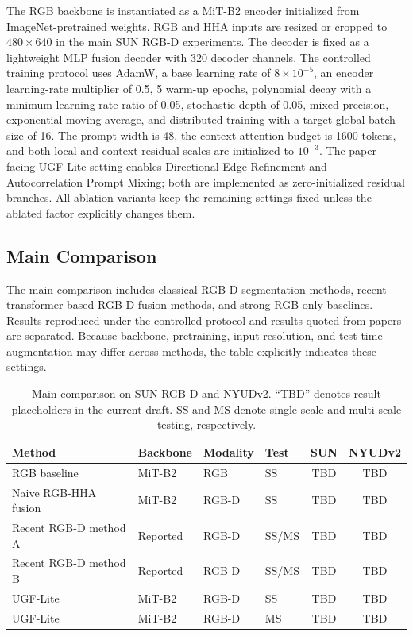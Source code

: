 \documentclass[a4paper,fleqn]{cas-dc}
\begin{document}
The RGB backbone is instantiated as a MiT-B2 encoder initialized from ImageNet-pretrained weights. RGB and HHA inputs are resized or cropped to $480\times640$ in the main SUN RGB-D experiments. The decoder is fixed as a lightweight MLP fusion decoder with 320 decoder channels. The controlled training protocol uses AdamW, a base learning rate of $8\times10^{-5}$, an encoder learning-rate multiplier of 0.5, 5 warm-up epochs, polynomial decay with a minimum learning-rate ratio of 0.05, stochastic depth of 0.05, mixed precision, exponential moving average, and distributed training with a target global batch size of 16. The prompt width is 48, the context attention budget is 1600 tokens, and both local and context residual scales are initialized to $10^{-3}$. The paper-facing UGF-Lite setting enables Directional Edge Refinement and Autocorrelation Prompt Mixing; both are implemented as zero-initialized residual branches. All ablation variants keep the remaining settings fixed unless the ablated factor explicitly changes them.

\subsection{Main Comparison}

The main comparison includes classical RGB-D segmentation methods, recent transformer-based RGB-D fusion methods, and strong RGB-only baselines. Results reproduced under the controlled protocol and results quoted from papers are separated. Because backbone, pretraining, input resolution, and test-time augmentation may differ across methods, the table explicitly indicates these settings.

\begin{table}%
\caption{Main comparison on SUN RGB-D and NYUDv2. ``TBD'' denotes result placeholders in the current draft. SS and MS denote single-scale and multi-scale testing, respectively.}\label{tab:main}
\begin{tabular*}{\tblwidth}{@{\extracolsep{\fill}}llllcc@{}}
\toprule
Method & Backbone & Modality & Test & SUN & NYUDv2 \\
\midrule
RGB baseline & MiT-B2 & RGB & SS & TBD & TBD \\
Naive RGB-HHA fusion & MiT-B2 & RGB-D & SS & TBD & TBD \\
Recent RGB-D method A & Reported & RGB-D & SS/MS & TBD & TBD \\
Recent RGB-D method B & Reported & RGB-D & SS/MS & TBD & TBD \\
UGF-Lite & MiT-B2 & RGB-D & SS & TBD & TBD \\
UGF-Lite & MiT-B2 & RGB-D & MS & TBD & TBD \\
\bottomrule
\end{tabular*}
\end{table}
\end{document}
